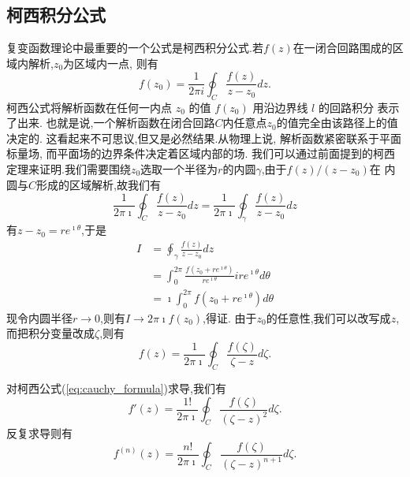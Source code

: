 \subsection{柯西积分公式}
\label{subsec:cauchy_formula}
复变函数理论中最重要的一个公式是柯西积分公式.若$f(z)$在一闭合回路围成的区域内解析,$z_0$为区域内一点,
则有
\begin{equation}
    f\left(z_0\right)=\frac{1}{2 \pi i} \oint_C \frac{f(z)}{z-z_0} d z .  
\end{equation}
柯西公式将解析函数在任何一内点 $z_0$ 的值 $f(z_0)$ 用沿边界线 $l$ 的回路积分 表示了出来.
也就是说,一个解析函数在闭合回路$C$内任意点$z_0$的值完全由该路径上的值决定的. 
这看起来不可思议,但又是必然结果.从物理上说, 解析函数紧密联系于平面标量场, 而平面场的边界条件决定着区域内部的场.
我们可以通过前面提到的柯西定理来证明.我们需要围绕$z_0$选取一个半径为$r$的内圆$\gamma$,由于$f(z)/(z-z_0)$在
内圆与$C$形成的区域解析,故我们有
\[ \frac{1}{2 \pi \imath} \oint_C \frac{f(z)}{z-z_0} d z = \frac{1}{2 \pi \imath} \oint_\gamma \frac{f(z)}{z-z_0} d z
    \]
有$z-z_0 = re^{\imath \theta}$,于是
\begin{equation}
    \begin{aligned}
        I &= \oint_\gamma \frac{f(z)}{z-z_0} d z
        \\
        & = \int _0 ^{2\pi} \frac{f(z_0 + re^{\imath \theta})}{re^{\imath \theta}} ire^{\imath \theta} d\theta
        \\
        & = \imath \int _0 ^{2\pi} f(z_0 + re^{\imath \theta}) d\theta
    \end{aligned}
\end{equation}
现令内圆半径$r\to 0$,则有$I\to 2\pi\imath f(z_0)$,得证.
由于$z_0$的任意性,我们可以改写成$z$,而把积分变量改成$\zeta$,则有
\begin{equation}
    f(z) = \frac{1}{2\pi \imath} \oint_C \frac{f(\zeta)}{\zeta - z} d \zeta.
    \label{eq:cauchy_formula}
\end{equation}

对柯西公式(\ref{eq:cauchy_formula})求导,我们有
\begin{equation}
    f'(z) = \frac{1!}{2\pi \imath} \oint_C \frac{f(\zeta)}{(\zeta - z)^2} d \zeta.
    \label{eq:cauchy_formula_1st_derivative}
\end{equation}
反复求导则有
\begin{equation}
    f^{(n)}(z) = \frac{n!}{2\pi \imath} \oint_C \frac{f(\zeta)}{(\zeta - z)^{n+1}} d \zeta.
    \label{eq:cauchy_formula_nth_derivative}
\end{equation}


